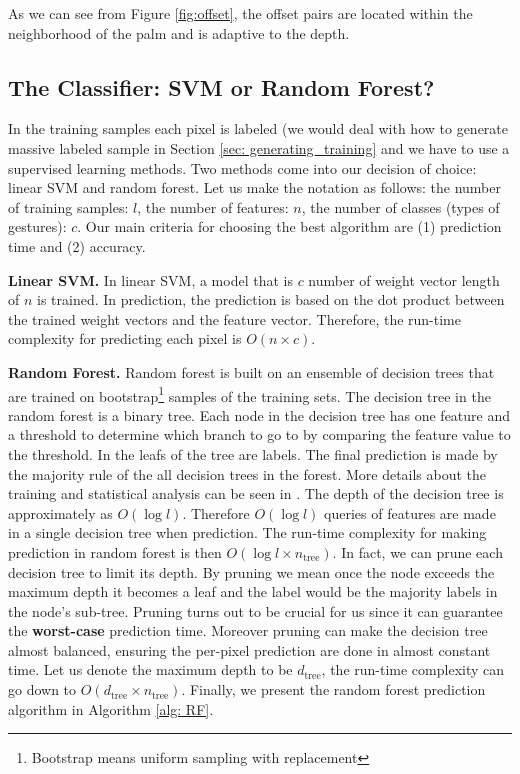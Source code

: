  As we can see from Figure \ref{fig:offset}, the offset pairs are located within the neighborhood of the palm and is adaptive to the depth.

\subsection{The Classifier: SVM or Random Forest?}

In the training samples each pixel is labeled (we would deal with how to generate massive labeled sample in Section \ref{sec: generating_training}   and we have to use a supervised learning methods. Two methods come into our decision of choice: linear SVM and random forest. Let us make the notation as follows: the number of training samples: $l$, the number of features: $n$, the number of classes (types of gestures): $c$. Our main criteria for choosing the best algorithm are (1) prediction time and (2) accuracy.

\textbf{Linear SVM.} In linear SVM, a model that is $c$ number of weight vector length of $n$ is trained. In prediction, the prediction is based on the dot product between the trained weight vectors and the feature vector. Therefore,  the run-time complexity for predicting each pixel is $O(n\times c)$.



\textbf{Random Forest.} Random forest is built on an ensemble of decision trees that are trained on  bootstrap\footnote{Bootstrap means uniform   sampling with replacement} samples of the training sets. The decision tree in the random forest is a binary tree. Each node in the decision tree has one feature and a threshold to determine which branch to go to by comparing the feature value to the threshold. In the leafs of the tree are labels. The final prediction is made by the majority rule of the all decision trees in the forest. More details about the training and statistical analysis can be seen in . The depth of the decision tree is approximately as $O(\log l)$. Therefore $O(\log l)$ queries of features are made in a single decision tree when prediction. The run-time complexity for making prediction in random forest is then $O(\log l \times n_{\text{tree}})$. In fact, we can prune each decision tree to limit its depth. By pruning we mean once the node exceeds the maximum depth it becomes a leaf and the label would be the majority labels in the node's sub-tree. Pruning turns out to be crucial for us since it can guarantee the \textbf{worst-case} prediction time. Moreover pruning can make the decision tree almost balanced, ensuring the per-pixel prediction are done in almost constant time. Let us denote the maximum depth to be  $d_{\text{tree}}$, the run-time complexity can go down to $O(d_{\text{tree}}\times n_{\text{tree}})$. Finally, we present the random forest prediction algorithm in Algorithm \ref{alg: RF}.

